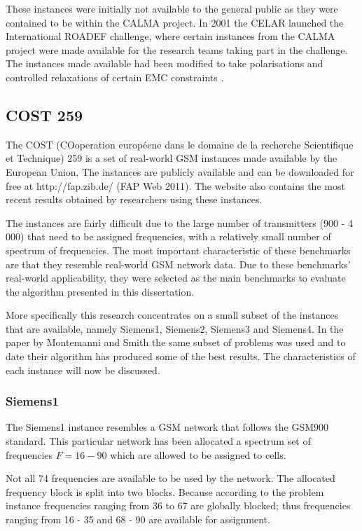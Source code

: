 These instances were initially not available to the general public as they were contained to be within the CALMA project. In 2001 the CELAR launched the International ROADEF challenge, where certain instances from the CALMA project were made available for the research teams taking part in the challenge. The instances made available had been modified to take polarisations and controlled relaxations of certain EMC constraints \cite{LowerPolarFAP}.
\subsection{COST 259}
\label{sec:COST259}
The COST (COoperation europ{é}ene dans le domaine de la recherche Scientifique et Technique) 259 is a set of real-world GSM instances made available by the European Union. The instances are publicly available and can  be downloaded for free at http://fap.zib.de/ (FAP Web 2011). The website also contains the most recent results obtained by researchers using these instances\cite{Karen2004,Eisenblatter}.

The instances are fairly difficult due to the large number of transmitters (900 - 4 000) that need to be assigned frequencies, with a relatively small number of spectrum of frequencies. The most important characteristic of these benchmarks are that they resemble real-world GSM network data. Due to these benchmarks' real-world applicability, they were selected as the main benchmarks to evaluate the algorithm presented in this dissertation.

More specifically this research concentrates on a small subset of the instances that are available, namely Siemens1, Siemens2, Siemens3 and Siemens4. In the paper by Montemanni and Smith \cite{TabuMontemanniSmith} the same subset of problems was used and to date their algorithm has produced some of the best results. The characteristics of each instance will now be discussed.
\subsubsection{Siemens1}
The Siemens1 instance resembles a GSM network that follows the GSM900 standard. This particular network has been allocated a spectrum set of frequencies $F = {16-90}$ which are allowed to be assigned to cells. 

Not all 74 frequencies are available to be used by the network. The allocated frequency block is split into two blocks. Because according to the problem instance frequencies ranging from 36 to 67 are globally blocked; thus frequencies ranging from 16  - 35 and 68 - 90 are available for assignment.

